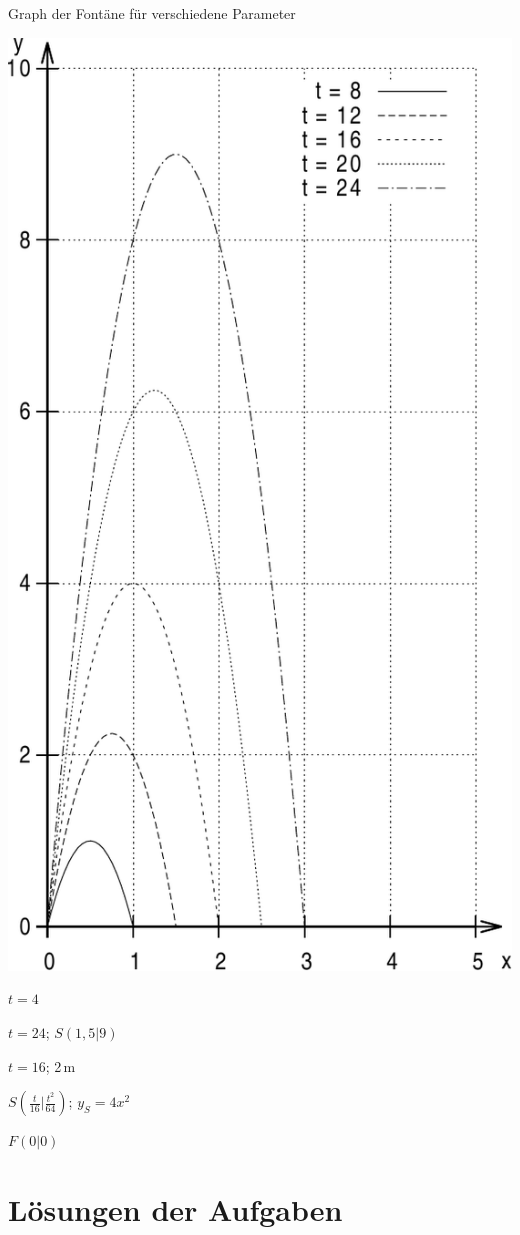 \documentclass[11pt,a4paper,twoside,fleqn]{article}
\begin{document}
\begin{solution}
  \begin{enumerate}
    \begin{minipage}[t]{0.4\linewidth}
    \item
      Graph der Fontäne für verschiedene Parameter

      \includegraphics[width=\linewidth]{pics/graph_4_1}
    \end{minipage}
    \hfill
\setcounter{enumi}{2}
\begin{minipage}[t]{0.5\linewidth}
\item $t=4$
\item $t=24$; $S(1,5|9)$
\item $t=16$; 2\,m
\item $S(\frac t {16}| \frac {t^2} {64})$;\; $y_S=4x^2$
\item $F(0|0)$
\end{minipage}
\end{enumerate}
\end{solution}

\newpage
\section{Lösungen der Aufgaben}
{\scriptsize\printsolutions}
\end{document}
